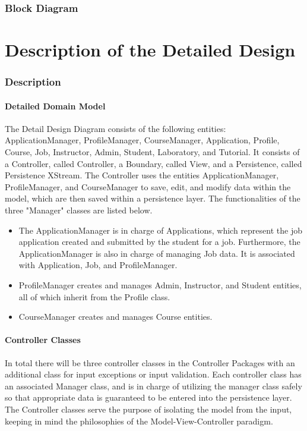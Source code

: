 \documentclass[12pt]{report}
\begin{document}
\section{Block Diagram}


\part{Description of the Detailed Design}
\section{Description}
\subsection{Detailed Domain Model}
The Detail Design Diagram consists of the following entities: ApplicationManager, ProfileManager,
CourseManager, Application, Profile, Course, Job, Instructor, Admin, Student, Laboratory, and
Tutorial. It consists of a Controller, called Controller, a Boundary, called View, and a
Persistence, called Persistence XStream. The Controller uses the entities ApplicationManager,
ProfileManager, and CourseManager to save, edit, and modify data within the model, which are then
saved within a persistence layer. The functionalities of the three "Manager" classes are listed
below.
\begin{itemize}
	\item The ApplicationManager is in charge of Applications, which represent the job application
		created and submitted
		by the student for a job. Furthermore, the ApplicationManager is also in charge of managing
		Job data. It is associated with Application, Job, and ProfileManager.
	\item ProfileManager creates and manages Admin, Instructor, and Student entities, all of which inherit from
		the Profile class.
	\item CourseManager creates and manages Course entities.
\end{itemize}
\subsection{Controller Classes}
In total there will be three controller classes in the Controller Packages with an additional class
for input exceptions or input validation. Each controller class has an associated Manager class, and
is in charge of utilizing the manager class safely so that appropriate data is guaranteed to be
entered into the persistence layer.\\
The Controller classes serve the purpose of isolating the model from the input, keeping in mind the
philosophies of the Model-View-Controller paradigm.
\end{document}

